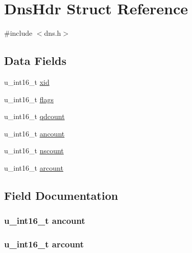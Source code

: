 \hypertarget{struct_dns_hdr}{}\section{Dns\+Hdr Struct Reference}
\label{struct_dns_hdr}


{\ttfamily \#include $<$dns.\+h$>$}

\subsection*{Data Fields}
\begin{DoxyCompactItemize}
\item 
u\+\_\+int16\+\_\+t \hyperlink{struct_dns_hdr_a0d82f4641a97b37727ccbead814b84f7}{xid}
\item 
u\+\_\+int16\+\_\+t \hyperlink{struct_dns_hdr_a9ee1a422c42e31a1f1638ac614822623}{flags}
\item 
u\+\_\+int16\+\_\+t \hyperlink{struct_dns_hdr_a47208e7c5942b3c64bc2791d676e6f8e}{qdcount}
\item 
u\+\_\+int16\+\_\+t \hyperlink{struct_dns_hdr_ada275e3b1abddb43d04584b4c6395bde}{ancount}
\item 
u\+\_\+int16\+\_\+t \hyperlink{struct_dns_hdr_aa58fc67b6cd177d0c2cb08a387bea37c}{nscount}
\item 
u\+\_\+int16\+\_\+t \hyperlink{struct_dns_hdr_a0d011948ae7d3da6e09bdac9c0611f04}{arcount}
\end{DoxyCompactItemize}


\subsection{Field Documentation}
\subsubsection[{\texorpdfstring{ancount}{ancount}}]{\setlength{\rightskip}{0pt plus 5cm}u\+\_\+int16\+\_\+t ancount}\hypertarget{struct_dns_hdr_ada275e3b1abddb43d04584b4c6395bde}{}\label{struct_dns_hdr_ada275e3b1abddb43d04584b4c6395bde}
\subsubsection[{\texorpdfstring{arcount}{arcount}}]{\setlength{\rightskip}{0pt plus 5cm}u\+\_\+int16\+\_\+t arcount}\hypertarget{struct_dns_hdr_a0d011948ae7d3da6e09bdac9c0611f04}{}\label{struct_dns_hdr_a0d011948ae7d3da6e09bdac9c0611f04}
